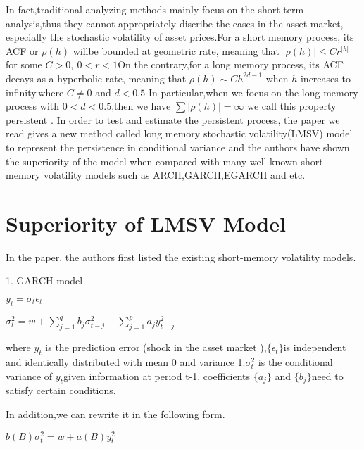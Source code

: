 \documentclass[10pt,a4paper]{article}
\begin{document}
 In fact,traditional analyzing methods mainly focus on the short-term analysis,thus they cannot appropriately discribe the cases in the asset market, especially  the stochastic volatility  of asset prices.For a short memory process, its ACF or $\rho(h)$ willbe bounded at geometric rate, meaning that $|\rho(h)|\leq C r^{|h|}$ for some $C>0,\  0<r<1 $On the contrary,for a long memory process, its ACF decays as a hyperbolic rate, meaning that $\rho(h)\sim Ch^{2d-1}$ when $h$ increases to infinity.where $C\neq 0$ and $d<0.5$ In particular,when we focus on the long memory process with $0<d<0.5$,then we have $\sum |\rho(h)|=\infty$ we call this property persistent .
In order to test and estimate the persistent process, the paper we read gives a new method called long memory stochastic volatility(LMSV) model to represent the persistence in conditional variance and the authors have shown the superiority of the model when compared with many well known short-memory volatility models such as ARCH,GARCH,EGARCH and etc.




 
\section{Superiority of LMSV Model}

In the paper, the authors first listed the existing short-memory volatility models.

\vspace{0.5cm}

1. GARCH model 

\begin{center}$\displaystyle y_t=\sigma_t\epsilon_t$\end{center}

\begin{center} $\displaystyle \sigma_t^2=w+\sum_{j=1}^{q}b_j\sigma^2_{t-j}+\sum_{j=1}^{p}a_jy^2_{t-j} $ \end{center}

where $y_t$ is the prediction error (shock in the asset market ),$ \{ \epsilon_t\} $is independent and identically distributed with mean 0 and variance 1.$\sigma^2_t$ is the conditional variance of $y_t $given information at period t-1.
coefficients $\{a_j\}$ and $\{b_j\}$need to satisfy certain conditions.

In addition,we can rewrite it in the following form.

\begin{center}$\displaystyle b(B)\sigma^2_t=w+a(B)y^2_t$\end{center} 
\end{document}
